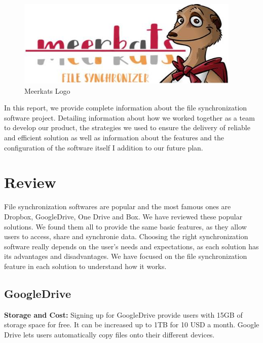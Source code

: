 \documentclass{article}
\begin{document}
\begin{figure}[h]
    \centering
    \includegraphics[width=0.95\textwidth]{logo}
    \caption{Meerkats Logo}
    \label{fig:logo1}
\end{figure}

In this report, we provide complete information about the file synchronization software project. Detailing information about how we worked together as a team to develop our product, the strategies we used to ensure the delivery of reliable and efficient solution as well as information about the features and the configuration of the software itself I addition to our future plan.


\section{Review}
File synchronization softwares are popular and the most famous ones are Dropbox, GoogleDrive, One Drive and Box. We have reviewed these popular solutions. We found them all to provide the same basic features, as they allow users to access, share and synchronie data. Choosing the right synchronization software really depends on the user’s needs and expectations, as each solution has its advantages and disadvantages. We have focused on the file synchronization feature in each solution to understand how it works.

\subsection{GoogleDrive}
\textbf{Storage and Cost:}
Signing up for GoogleDrive provide users with 15GB of storage space for free. It can be increased up to 1TB for 10 USD a month. Google Drive lets users automatically copy files onto their different devices.
\end{document}
